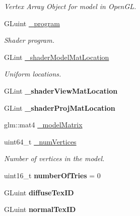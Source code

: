 \begin{DoxyCompactItemize}
\begin{DoxyCompactList}\small\item\em Vertex Array Object for model in Open\+G\+L. \end{DoxyCompactList}\item 
\hypertarget{class_game_model_a06864c23597eb513f366865457247d3d}{G\+Luint \hyperlink{class_game_model_a06864c23597eb513f366865457247d3d}{\+\_\+program}}\label{class_game_model_a06864c23597eb513f366865457247d3d}

\begin{DoxyCompactList}\small\item\em Shader program. \end{DoxyCompactList}\item 
\hypertarget{class_game_model_a2f74f4c5f639bcf15b8ee1338ed4a2c8}{G\+Lint \hyperlink{class_game_model_a2f74f4c5f639bcf15b8ee1338ed4a2c8}{\+\_\+shader\+Model\+Mat\+Location}}\label{class_game_model_a2f74f4c5f639bcf15b8ee1338ed4a2c8}

\begin{DoxyCompactList}\small\item\em Uniform locations. \end{DoxyCompactList}\item 
\hypertarget{class_game_model_a3cf528072f39873007b43572ba367e61}{G\+Lint {\bfseries \+\_\+shader\+View\+Mat\+Location}}\label{class_game_model_a3cf528072f39873007b43572ba367e61}

\item 
\hypertarget{class_game_model_af4cf265c9809d07a5f0e5a0b6d5d0ecf}{G\+Lint {\bfseries \+\_\+shader\+Proj\+Mat\+Location}}\label{class_game_model_af4cf265c9809d07a5f0e5a0b6d5d0ecf}

\item 
glm\+::mat4 \hyperlink{class_game_model_a0196cbf5e8a2c20a5aed14f8d044b8e4}{\+\_\+model\+Matrix}
\item 
\hypertarget{class_game_model_acb85295329ba0dbbbbe39a22e904e0ad}{uint64\+\_\+t \hyperlink{class_game_model_acb85295329ba0dbbbbe39a22e904e0ad}{\+\_\+num\+Vertices}}\label{class_game_model_acb85295329ba0dbbbbe39a22e904e0ad}

\begin{DoxyCompactList}\small\item\em Number of vertices in the model. \end{DoxyCompactList}\item 
\hypertarget{class_game_model_a57ebb1fc7b73a46547db86f8dbd0252a}{uint16\+\_\+t {\bfseries number\+Of\+Tries} = 0}\label{class_game_model_a57ebb1fc7b73a46547db86f8dbd0252a}

\item 
\hypertarget{class_game_model_abbfb528fef068fa39d746edb95e1a796}{G\+Luint {\bfseries diffuse\+Tex\+I\+D}}\label{class_game_model_abbfb528fef068fa39d746edb95e1a796}

\item 
\hypertarget{class_game_model_ab9f2dd6924283e871d03f67f0d003381}{G\+Luint {\bfseries normal\+Tex\+I\+D}}\label{class_game_model_ab9f2dd6924283e871d03f67f0d003381}

\end{DoxyCompactItemize}


